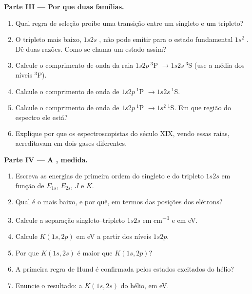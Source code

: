 \begin{problem}
\medskip\noindent\textbf{Parte III --- Por que duas famílias.}
\begin{enumerate}[resume]
  \item Qual regra de seleção proíbe uma transição entre um singleto e um
        tripleto?
  \item O tripleto mais baixo, $1s2s$ , não pode emitir para o
        estado fundamental $1s^2$ . Dê duas razões. Como se
        chama um estado assim?
  \item Calcule o comprimento de onda da raia $1s2p\ {}^3$P $\to 1s2s\ {}^3$S (use
        a média dos níveis ${}^3$P).
  \item Calcule o comprimento de onda de $1s2p\ {}^1$P $\to 1s2s\ {}^1$S.
  \item Calcule o comprimento de onda de $1s2p\ {}^1$P $\to 1s^2\ {}^1$S. Em que
        região do espectro ele está?
  \item Explique por que os espectroscopistas do século XIX, vendo essas raias,
        acreditavam em dois gases diferentes.
\end{enumerate}

\medskip\noindent\textbf{Parte IV --- A , medida.}
\begin{enumerate}[resume]
  \item Escreva as energias de primeira ordem do singleto e do tripleto $1s2s$
        em função de $E_{1s}$, $E_{2s}$, $J$ e $K$.
  \item Qual é o mais baixo, e por quê, em termos das posições dos elétrons?
  \item Calcule a separação singleto--tripleto $1s2s$ em \unit{cm^{-1}} e em eV.
  \item Calcule $K(1s,2p)$ em eV a partir dos níveis $1s2p$.
  \item Por que $K(1s,2s)$ é maior que $K(1s,2p)$?
  \item A primeira regra de Hund é confirmada pelos estados excitados do hélio?
  \item Enuncie o resultado: a  $K(1s,2s)$ do hélio, em
        eV.
\end{enumerate}
\end{problem}
